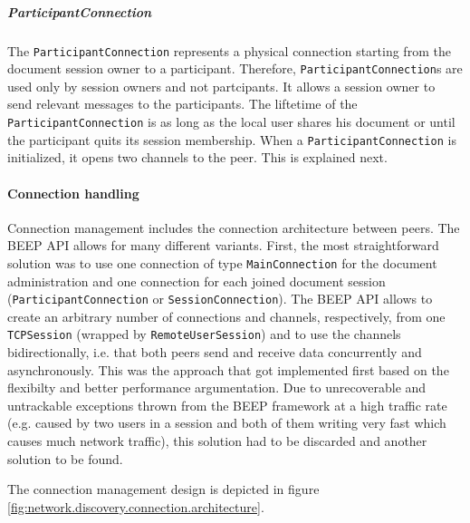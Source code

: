 \subparagraph{ParticipantConnection}
The \texttt{ParticipantConnection} represents a physical connection starting from the document session owner to a participant. Therefore, \texttt{ParticipantConnection}s are used only by session owners and not partcipants. It allows a session owner to send relevant messages to the participants. The liftetime of the \texttt{ParticipantConnection} is as long as the local user shares his document or until the participant quits its session membership. When a \texttt{ParticipantConnection} is initialized, it opens two channels to the peer. This is explained next.


\paragraph{Connection handling}
Connection management includes the connection architecture between peers. The BEEP API allows for many different variants. First, the most straightforward solution was to use one connection of type \texttt{MainConnection} for the document administration and one connection for each joined document session (\texttt{ParticipantConnection} or \texttt{SessionConnection}). The BEEP API allows to create an arbitrary number of connections and channels, respectively, from one \texttt{TCPSession} (wrapped by \texttt{RemoteUserSession}) and to use the channels bidirectionally, i.e. that both peers send and receive data concurrently and asynchronously. This was the approach that got implemented first based on the flexibilty and better performance argumentation. Due to unrecoverable and untrackable exceptions thrown from the BEEP framework at a high traffic rate (e.g. caused by two users in a session and both of them writing very fast which causes much network traffic), this solution had to be discarded and another solution to be found. 

The connection management design is depicted in figure \ref{fig:network.discovery.connection.architecture}.

